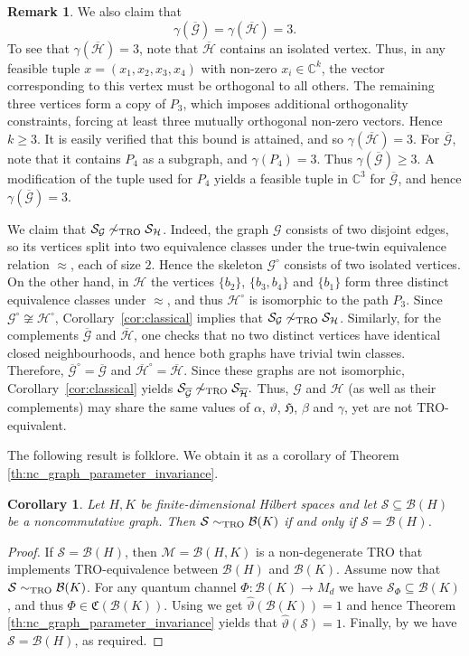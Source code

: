 \documentclass[11pt]{amsart}
\numberwithin{equation}{section}
\theoremstyle{plain}
\newtheorem{corollary}[theorem]{Corollary}
\theoremstyle{definition}
\newtheorem{remark}[theorem]{Remark}
\theoremstyle{remark}
\newcommand{\B}{{\mathcal{B}}}
\newcommand{\G}{{\mathcal{G}}}
\renewcommand{\H}{{\mathcal{H}}}
\newcommand{\M}{{\mathcal{M}}}
\renewcommand{\S}{{\mathcal{S}}}
\def\ga{\gamma}
\newcommand{\fH}{{\mathfrak{H}}}
\newcommand{\ol}{\overline}
\newcommand{\wh}{\widehat}
\begin{document}
\begin{remark}
We also claim that
\[
\ga(\ol{\G})=\ga(\ol{\H})=3.
\]
To see that $\ga(\ol{\H})=3$, note that $\ol{\H}$ contains an isolated vertex. Thus, in any feasible tuple $x=(x_1,x_2,x_3,x_4)$ with non-zero $x_i\in \mathbb{C}^k$, the vector corresponding to this vertex must be orthogonal to all others. The remaining three vertices form a copy of $P_3$, which imposes additional orthogonality constraints, forcing at least three mutually orthogonal non-zero vectors. Hence $k\ge 3$. It is easily verified that this bound is attained, and so $\ga(\ol{\H})=3$.
For $\ol{\G}$, note that it contains $P_4$ as a subgraph, and $\ga(P_4)=3$. Thus $\ga(\ol{\G})\ge 3$. A modification of the tuple used for $P_4$ yields a feasible tuple in $\mathbb{C}^3$ for $\ol{\G}$, and hence $\ga(\ol{\G})=3$. 

We claim that $\S_{\G} \not\sim_{\rm TRO} \S_{\H}$. Indeed, the graph $\G$ consists of two disjoint edges, so its vertices split into two equivalence classes under the true-twin equivalence relation $\approx$, each of size $2$. Hence the skeleton $\G^\circ$ consists of two isolated vertices. 
On the other hand, in $\H$ the vertices $\{b_2\}$, $\{b_3,b_4\}$ and $\{b_1\}$ form three distinct equivalence classes under $\approx$, and thus $\H^\circ$ is isomorphic to the path $P_3$. Since $\G^\circ \not\cong \H^\circ$, Corollary~\ref{cor:classical} implies that $\S_{\G} \not\sim_{\rm TRO} \S_{\H}$.
Similarly, for the complements $\ol{\G}$ and $\ol{\H}$, one checks that no two distinct vertices have identical closed neighbourhoods, and hence both graphs have trivial twin classes. Therefore, $\ol{\G}^\circ=\ol{\G} $
and $\ol{\H}^\circ=\ol{\H}$.
Since these graphs are not isomorphic, Corollary~\ref{cor:classical} yields
\( 
\S_{\ol{\G}} \not\sim_{\rm TRO} \S_{\ol{\H}}.
\)
Thus, $\G$ and $\H$ (as well as their complements) may share the same values of $\alpha$, $\vartheta$, $\fH$, $\beta$ and $\ga$, yet are not TRO-equivalent.
\end{remark}

The following result is folklore. We obtain it as a corollary of Theorem \ref{th:nc_graph_parameter_invariance}.

\begin{corollary}\label{C:fullmattro}
Let $H, K$ be finite-dimensional Hilbert spaces and let $\S \subseteq \B(H)$ be a noncommutative graph. Then $\S \sim_{\rm TRO} \B(K)$ if and only if $\S = \B(H)$. 
\end{corollary}

\begin{proof}
If $\S = \B(H)$, then $\M = \B(H, K)$ is a non-degenerate TRO that implements TRO-equivalence between $\B(H)$ and $\B(K)$. Assume now that $\S \sim_{\rm TRO} \B(K)$. For any quantum channel $\Phi\colon \B(K)\rightarrow M_{d}$ we have $\S_{\Phi} \subseteq \B(K)$, and thus $\Phi \in \mathfrak{C}(\B(K))$. Using \cite[Theorem 5.1]{BTW21} we get $\wh{\vartheta}(\B(K)) = 1$ and hence Theorem \ref{th:nc_graph_parameter_invariance} yields that $\wh{\vartheta}(\S) = 1$. Finally, by \cite[Proposition 6.7]{BTW21} we have $\S = \B(H)$, as required.
\end{proof}
\end{document}

